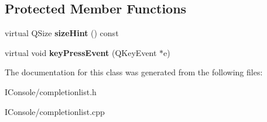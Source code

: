 \subsection*{Protected Member Functions}
\begin{DoxyCompactItemize}
\item 
\hypertarget{class_completion_list_a7be43babeb7eb4a7689aab2d03a558b9}{virtual Q\-Size {\bfseries size\-Hint} () const }\label{class_completion_list_a7be43babeb7eb4a7689aab2d03a558b9}

\item 
\hypertarget{class_completion_list_aae230c3650456c122f0740f2a2c93771}{virtual void {\bfseries key\-Press\-Event} (Q\-Key\-Event $\ast$e)}\label{class_completion_list_aae230c3650456c122f0740f2a2c93771}

\end{DoxyCompactItemize}


The documentation for this class was generated from the following files\-:\begin{DoxyCompactItemize}
\item 
I\-Console/completionlist.\-h\item 
I\-Console/completionlist.\-cpp\end{DoxyCompactItemize}
